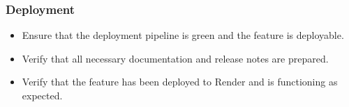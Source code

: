 \subsubsection{Deployment}
\begin{itemize}
    \item Ensure that the deployment pipeline is green and the feature is deployable.
    \item Verify that all necessary documentation and release notes are prepared.
    \item Verify that the feature has been deployed to Render and is functioning as expected.
\end{itemize}